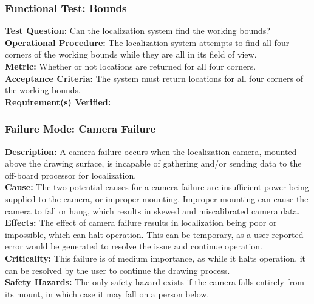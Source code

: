 \subsubsection{Functional Test: Bounds}
\label{sec:localization_ft_bounds}
\textbf{Test Question:} Can the localization system find the working bounds?\\
\textbf{Operational Procedure:} The localization system attempts to find all four corners of the working bounds while they are all in its field of view.\\
\textbf{Metric:} Whether or not locations are returned for all four corners.\\
\textbf{Acceptance Criteria:} The system must return locations for all four corners of the working bounds.\\
\textbf{Requirement(s) Verified:} 

\subsubsection{Failure Mode: Camera Failure}
\label{sec:localization_fm_cam}
\textbf{Description:} A camera failure occurs when the localization camera, mounted above the drawing surface, is incapable of gathering and/or sending data to the off-board processor for localization.\\
\textbf{Cause:} The two potential causes for a camera failure are insufficient power being supplied to the camera, or improper mounting. Improper mounting can cause the camera to fall or hang, which results in skewed and miscalibrated camera data.\\
\textbf{Effects:}  The effect of camera failure results in localization being poor or impossible, which can halt operation. This can be temporary, as a user-reported error would be generated to resolve the issue and continue operation.\\
\textbf{Criticality:}  This failure is of medium importance, as while it halts operation, it can be resolved by the user to continue the drawing process.\\
\textbf{Safety Hazards:} The only safety hazard exists if the camera falls entirely from its mount, in which case it may fall on a person below. \\

